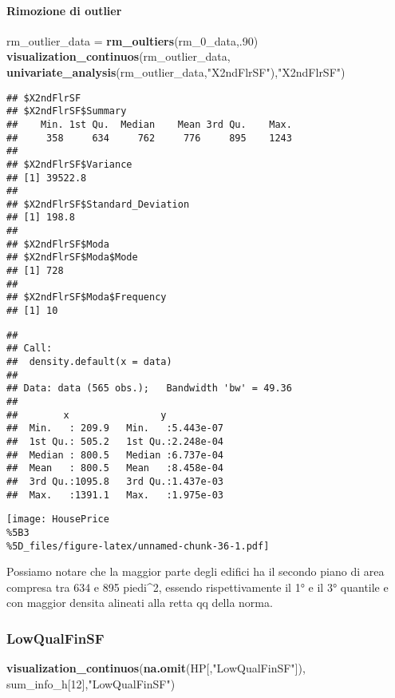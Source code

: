 \documentclass[
]{article}
\newenvironment{Shaded}{\begin{snugshade}}{\end{snugshade}}
\newcommand{\DecValTok}[1]{\textcolor[rgb]{0.00,0.00,0.81}{#1}}
\newcommand{\FunctionTok}[1]{\textcolor[rgb]{0.13,0.29,0.53}{\textbf{#1}}}
\newcommand{\NormalTok}[1]{#1}
\newcommand{\OtherTok}[1]{\textcolor[rgb]{0.56,0.35,0.01}{#1}}
\newcommand{\StringTok}[1]{\textcolor[rgb]{0.31,0.60,0.02}{#1}}
\begin{document}
\paragraph{Rimozione di outlier}\label{rimozione-di-outlier-7}

\begin{Shaded}
\begin{Highlighting}[]
\NormalTok{rm\_outlier\_data }\OtherTok{=} \FunctionTok{rm\_oultiers}\NormalTok{(rm\_0\_data,.}\DecValTok{90}\NormalTok{)}
\FunctionTok{visualization\_continuos}\NormalTok{(rm\_outlier\_data, }\FunctionTok{univariate\_analysis}\NormalTok{(rm\_outlier\_data,}\StringTok{"X2ndFlrSF"}\NormalTok{),}\StringTok{"X2ndFlrSF"}\NormalTok{)}
\end{Highlighting}
\end{Shaded}

\begin{verbatim}
## $X2ndFlrSF
## $X2ndFlrSF$Summary
##    Min. 1st Qu.  Median    Mean 3rd Qu.    Max. 
##     358     634     762     776     895    1243 
## 
## $X2ndFlrSF$Variance
## [1] 39522.8
## 
## $X2ndFlrSF$Standard_Deviation
## [1] 198.8
## 
## $X2ndFlrSF$Moda
## $X2ndFlrSF$Moda$Mode
## [1] 728
## 
## $X2ndFlrSF$Moda$Frequency
## [1] 10
\end{verbatim}

\begin{verbatim}
## 
## Call:
##  density.default(x = data)
## 
## Data: data (565 obs.);   Bandwidth 'bw' = 49.36
## 
##        x                y            
##  Min.   : 209.9   Min.   :5.443e-07  
##  1st Qu.: 505.2   1st Qu.:2.248e-04  
##  Median : 800.5   Median :6.737e-04  
##  Mean   : 800.5   Mean   :8.458e-04  
##  3rd Qu.:1095.8   3rd Qu.:1.437e-03  
##  Max.   :1391.1   Max.   :1.975e-03
\end{verbatim}

\texttt{[image: HousePrice\\\%5B3\\\%5D\_files/figure-latex/unnamed-chunk-36-1.pdf]}

Possiamo notare che la maggior parte degli edifici ha il secondo piano
di area compresa tra 634 e 895 piedi\^{}2, essendo rispettivamente il 1°
e il 3° quantile e con maggior densita alineati alla retta qq della
norma.

\subsubsection{LowQualFinSF}\label{lowqualfinsf}

\begin{Shaded}
\begin{Highlighting}[]
\FunctionTok{visualization\_continuos}\NormalTok{(}\FunctionTok{na.omit}\NormalTok{(HP[,}\StringTok{"LowQualFinSF"}\NormalTok{]), sum\_info\_h[}\DecValTok{12}\NormalTok{],}\StringTok{"LowQualFinSF"}\NormalTok{)}
\end{Highlighting}
\end{Shaded}
\end{document}
